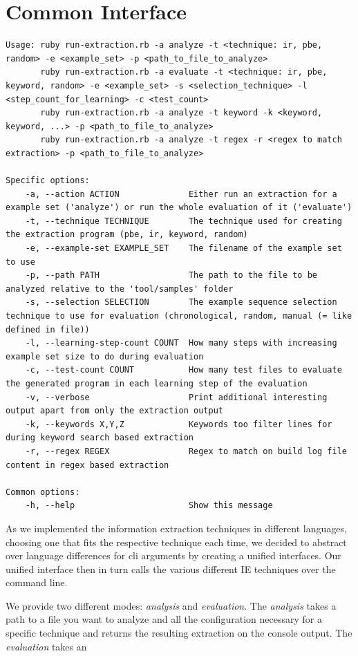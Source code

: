 \documentclass[\myrootdir/main.tex]{subfiles}
\begin{document}
\section{Common Interface}
\begin{lstlisting}
Usage: ruby run-extraction.rb -a analyze -t <technique: ir, pbe, random> -e <example_set> -p <path_to_file_to_analyze>
       ruby run-extraction.rb -a evaluate -t <technique: ir, pbe, keyword, random> -e <example_set> -s <selection_technique> -l <step_count_for_learning> -c <test_count>
       ruby run-extraction.rb -a analyze -t keyword -k <keyword, keyword, ...> -p <path_to_file_to_analyze>
       ruby run-extraction.rb -a analyze -t regex -r <regex to match extraction> -p <path_to_file_to_analyze>

Specific options:
    -a, --action ACTION              Either run an extraction for a example set ('analyze') or run the whole evaluation of it ('evaluate')
    -t, --technique TECHNIQUE        The technique used for creating the extraction program (pbe, ir, keyword, random)
    -e, --example-set EXAMPLE_SET    The filename of the example set to use
    -p, --path PATH                  The path to the file to be analyzed relative to the 'tool/samples' folder
    -s, --selection SELECTION        The example sequence selection technique to use for evaluation (chronological, random, manual (= like defined in file))
    -l, --learning-step-count COUNT  How many steps with increasing example set size to do during evaluation
    -c, --test-count COUNT           How many test files to evaluate the generated program in each learning step of the evaluation
    -v, --verbose                    Print additional interesting output apart from only the extraction output
    -k, --keywords X,Y,Z             Keywords too filter lines for during keyword search based extraction
    -r, --regex REGEX                Regex to match on build log file content in regex based extraction

Common options:
    -h, --help                       Show this message
\end{lstlisting}
As we implemented the information extraction techniques in different languages, choosing one that fits the respective technique each time, we decided to abstract over language differences for cli arguments by creating a unified interfaces. Our unified interface then in turn calls the various different IE techniques over the command line.

We provide two different modes: \emph{analysis} and \emph{evaluation}.
The \emph{analysis} takes a path to a file you want to analyze and all the configuration necessary for a specific technique and returns the resulting extraction on the console output. The \emph{evaluation} takes an 
\end{document}
